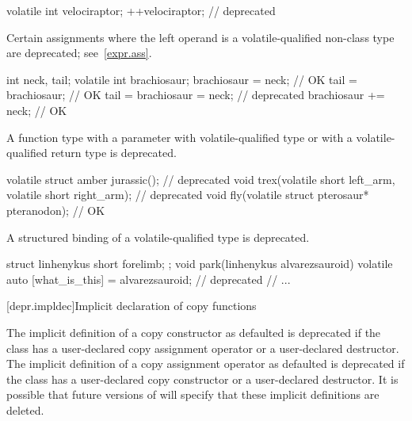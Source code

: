 \begin{example}
\begin{codeblock}
volatile int velociraptor;
++velociraptor;                     // deprecated
\end{codeblock}
\end{example}


\pnum
Certain assignments
where the left operand is a volatile-qualified non-class type
are deprecated; see~\ref{expr.ass}.

\begin{example}
\begin{codeblock}
int neck, tail;
volatile int brachiosaur;
brachiosaur = neck;                 // OK
tail = brachiosaur;                 // OK
tail = brachiosaur = neck;          // deprecated
brachiosaur += neck;                // OK
\end{codeblock}
\end{example}


\pnum
A function type
with a parameter with volatile-qualified type or
with a volatile-qualified return type is deprecated.

\begin{example}
\begin{codeblock}
volatile struct amber jurassic();                               // deprecated
void trex(volatile short left_arm, volatile short right_arm);   // deprecated
void fly(volatile struct pterosaur* pteranodon);                // OK
\end{codeblock}
\end{example}


\pnum
A structured binding of a volatile-qualified type
is deprecated.

\begin{example}
\begin{codeblock}
struct linhenykus { short forelimb; };
void park(linhenykus alvarezsauroid) {
  volatile auto [what_is_this] = alvarezsauroid;                // deprecated
  // ...
}
\end{codeblock}
\end{example}


[depr.impldec]{Implicit declaration of copy functions}

\pnum
The implicit definition of a copy constructor
as defaulted is deprecated if the class has
a user-declared copy assignment operator or
a user-declared destructor.
The implicit definition of a copy assignment operator
as defaulted is deprecated if the class has
a user-declared copy constructor or
a user-declared destructor.
It is possible that future versions of \Cpp{} will specify
that these implicit definitions are deleted.

